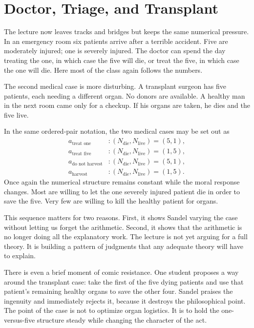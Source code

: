 \section{Doctor, Triage, and Transplant}

The lecture now leaves tracks and bridges but keeps the same numerical pressure. In an emergency room six patients arrive after a terrible accident. Five are moderately injured; one is severely injured. The doctor can spend the day treating the one, in which case the five will die, or treat the five, in which case the one will die. Here most of the class again follows the numbers.

The second medical case is more disturbing. A transplant surgeon has five patients, each needing a different organ. No donors are available. A healthy man in the next room came only for a checkup. If his organs are taken, he dies and the five live.

In the same ordered-pair notation, the two medical cases may be set out as
\begin{align}
a_{\text{treat one}} &: (N_{\text{die}},N_{\text{live}}) = (5,1), \\
a_{\text{treat five}} &: (N_{\text{die}},N_{\text{live}}) = (1,5), \\
a_{\text{do not harvest}} &: (N_{\text{die}},N_{\text{live}}) = (5,1), \\
a_{\text{harvest}} &: (N_{\text{die}},N_{\text{live}}) = (1,5).
\end{align}
Once again the numerical structure remains constant while the moral response changes. Most are willing to let the one severely injured patient die in order to save the five. Very few are willing to kill the healthy patient for organs.

This sequence matters for two reasons. First, it shows Sandel varying the case without letting us forget the arithmetic. Second, it shows that the arithmetic is no longer doing all the explanatory work. The lecture is not yet arguing for a full theory. It is building a pattern of judgments that any adequate theory will have to explain.

There is even a brief moment of comic resistance. One student proposes a way around the transplant case: take the first of the five dying patients and use that patient's remaining healthy organs to save the other four. Sandel praises the ingenuity and immediately rejects it, because it destroys the philosophical point. The point of the case is not to optimize organ logistics. It is to hold the one-versus-five structure steady while changing the character of the act.

